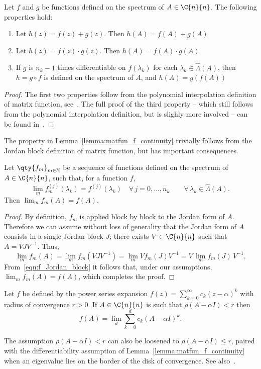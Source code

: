 \begin{lemma}
	Let $f$ and $g$ be functions defined on the spectrum of $A\in\C{n}{n}$. The following properties hold:
	\begin{enumerate}
		\item Let $h(z)=f(z)+g(z)$. Then $h(A)=f(A)+g(A)$
		\item Let $h(z)=f(z)\cdot g(z)$. Then $h(A)=f(A)\cdot g(A)$
		\item If $g$ is $n_k-1$ times differentiable on $f(\lambda_k)$ for each $\lambda_k\in\hat{\Lambda}(A)$, then $h=g\circ f$ is defined on the spectrum of $A$, and $h(A) = g(f(A))$
	\end{enumerate}
\end{lemma}
\begin{proof}
	The first two properties follow from the polynomial interpolation definition of matrix function, see~\cite[Thm.~1.15]{higham:matfun_book}. The full proof of the third property -- which still follows from the polynomial interpolation definition, but is slighly more involved -- can be found in~\cite[Thm.~1.17]{higham:matfun_book}.
\end{proof}

The property in Lemma~\ref{lemma:matfun_f_continuity} trivially follows from the Jordan block definition of matrix function, but has important consequences.
\begin{lemma}\label{lemma:matfun_f_continuity}
	Let $\qty{f_m}_{m\in\mathbb{N}}$ be a sequence of functions defined on the spectrum of $A\in\C{n}{n}$, such that, for a function $f$, 
	\[
	\lim_m f_m^{(j)}(\lambda_k)=f^{(j)}(\lambda_k)\quad\forall\,j=0,\dots,n_k\qquad\forall\,\lambda_k\in\hat{\Lambda}(A).
	\]
	Then $\lim_m f_m(A)=f(A)$. 
\end{lemma}
\begin{proof}
	By definition, $f_m$ is applied block by block to the Jordan form of $A$. Therefore we can assume without loss of generality that the Jordan form of $A$ consists in a single Jordan block $J$; there exists $V\in\C{n}{n}$ such that $A=VJV^{-1}$. Thus,
	\[
	\lim_m f_m(A)=\lim_m f_m(VJV^{-1})=\lim_m Vf_m(J)V^{-1}=V\,\lim_m f_m(J)\,V^{-1}.
	\]
	From~\eqref{eqn:f_Jordan_block} it follows that, under our assumptions, $\lim_m f_m(A)=f(A)$, which completes the proof.
\end{proof}
\begin{corollario_lemma}\label{cor:matfun_power_series}
	Let $f$ be defined by the power series expansion $f(z)=\sum_{k=0}^{\infty}c_k(z-\alpha)^k$ with radius of convergence $r>0$. If $A\in\C{n}{n}$ is such that $\rho(A-\alpha I)<r$ then
	\[
		f(A)=\lim_d\sum_{k=0}^{d}c_k(A-\alpha I)^k.
	\]
\end{corollario_lemma}
The assumption $\rho(A-\alpha I)<r$ can also be loosened to $\rho(A-\alpha I)\le r$, paired with the differentiability assumption of Lemma~\ref{lemma:matfun_f_continuity} when an eigenvalue lies on the border of the disk of convergence. See also~\cite[Thm.~4.7]{higham:matfun_book}.
\smallskip 

